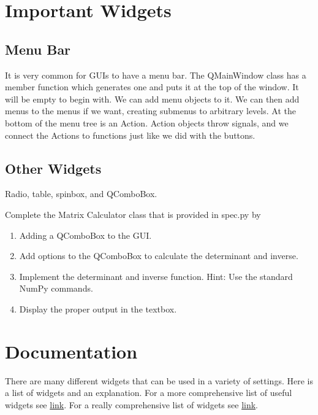 \section*{Important Widgets}

\subsection*{Menu Bar}
It is very common for GUIs to have a menu bar.  The QMainWindow class has a member function which generates one and puts it at the top of the window.  It will be empty to begin with.  We can add menu objects to it.  We can then add menus to the menus if we want, creating submenus to arbitrary levels.  At the bottom of the menu tree is an Action.  Action objects throw signals, and we connect the Actions to functions just like we did with the buttons.

\subsection*{Other Widgets}
Radio, table, spinbox, and QComboBox.

\begin{problem}
Complete the Matrix Calculator class that is provided in spec.py by
\begin{enumerate}
\item Adding a QComboBox to the GUI.
\item Add options to the QComboBox to calculate the determinant and inverse.
\item Implement the determinant and inverse function.  Hint: Use the standard NumPy commands.
\item Display the proper output in the textbox.
\end{enumerate}
\end{problem}

\section*{Documentation}
There are many different widgets that can be used in a variety of settings.  Here is a list of widgets and an explanation.  For a more comprehensive list of useful widgets see \href{http://doc.qt.io/qt-4.8/widgets-and-layouts.html}{link}.
For a really comprehensive list of widgets see \href{http://pyqt.sourceforge.net/Docs/PyQt4/qtgui.html}{link}.
